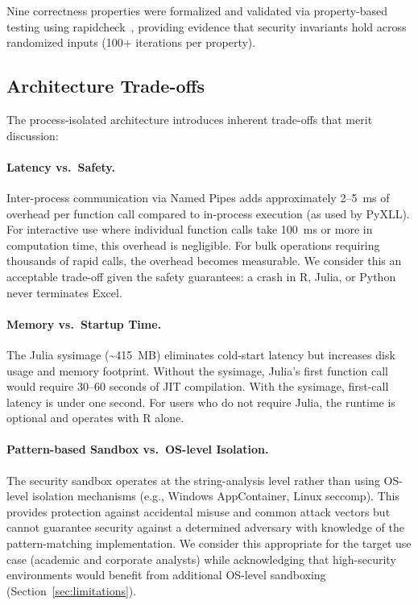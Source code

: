 Nine correctness properties were formalized and validated via property-based testing using rapidcheck~\citep{rapidcheck2023}, providing evidence that security invariants hold across randomized inputs (100+ iterations per property).

\subsection{Architecture Trade-offs}

The process-isolated architecture introduces inherent trade-offs that merit discussion:

\paragraph{Latency vs.\ Safety.} Inter-process communication via Named Pipes adds approximately 2--5~ms of overhead per function call compared to in-process execution (as used by PyXLL). For interactive use where individual function calls take 100~ms or more in computation time, this overhead is negligible. For bulk operations requiring thousands of rapid calls, the overhead becomes measurable. We consider this an acceptable trade-off given the safety guarantees: a crash in R, Julia, or Python never terminates Excel.

\paragraph{Memory vs.\ Startup Time.} The Julia sysimage (\textasciitilde415~MB) eliminates cold-start latency but increases disk usage and memory footprint. Without the sysimage, Julia's first function call would require 30--60 seconds of JIT compilation. With the sysimage, first-call latency is under one second. For users who do not require Julia, the runtime is optional and \neven{} operates with R alone.

\paragraph{Pattern-based Sandbox vs.\ OS-level Isolation.} The security sandbox operates at the string-analysis level rather than using OS-level isolation mechanisms (e.g., Windows AppContainer, Linux seccomp). This provides protection against accidental misuse and common attack vectors but cannot guarantee security against a determined adversary with knowledge of the pattern-matching implementation. We consider this appropriate for the target use case (academic and corporate analysts) while acknowledging that high-security environments would benefit from additional OS-level sandboxing (Section~\ref{sec:limitations}).

